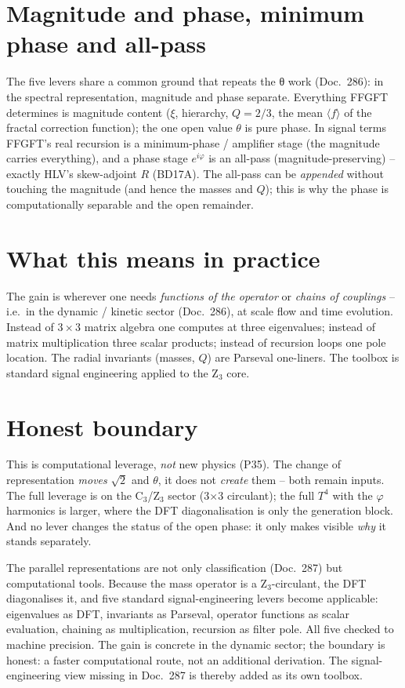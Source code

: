 \section{Magnitude and phase, minimum phase and all-pass}
The five levers share a common ground that repeats the θ work (Doc.~286): in the spectral
representation, magnitude and phase separate. Everything FFGFT determines is magnitude content ($\xi$,
hierarchy, $Q=2/3$, the mean $\langle f\rangle$ of the fractal correction function); the one open value $\theta$ is pure phase. In signal terms
FFGFT's real recursion is a minimum-phase / amplifier stage (the magnitude carries everything), and a
phase stage $e^{i\varphi}$ is an all-pass (magnitude-preserving) -- exactly HLV's skew-adjoint $R$
(BD17A). The all-pass can be \emph{appended} without touching the magnitude (and hence the masses and
$Q$); this is why the phase is computationally separable and the open remainder.

\section{What this means in practice}
The gain is wherever one needs \emph{functions of the operator} or \emph{chains of couplings} -- i.e.\
in the dynamic / kinetic sector (Doc.~286), at scale flow and time evolution. Instead of $3\times3$
matrix algebra one computes at three eigenvalues; instead of matrix multiplication three scalar
products; instead of recursion loops one pole location. The radial invariants (masses, $Q$) are
Parseval one-liners. The toolbox is standard signal engineering applied to the Z$_3$ core.

\section{Honest boundary}
\begin{important}
This is computational leverage, \emph{not} new physics (P35). The change of representation \emph{moves}
$\sqrt2$ and $\theta$, it does not \emph{create} them -- both remain inputs. The full leverage is on
the C$_3$/Z$_3$ sector (3$\times$3 circulant); the full $T^4$ with the $\varphi$ harmonics is larger,
where the DFT diagonalisation is only the generation block. And no lever changes the status of the open
phase: it only makes visible \emph{why} it stands separately.
\end{important}

\begin{conclusionBox}
The parallel representations are not only classification (Doc.~287) but computational tools. Because
the mass operator is a Z$_3$-circulant, the DFT diagonalises it, and five standard signal-engineering
levers become applicable: eigenvalues as DFT, invariants as Parseval, operator functions as scalar
evaluation, chaining as multiplication, recursion as filter pole. All five checked to machine precision.
The gain is concrete in the dynamic sector; the boundary is honest: a faster computational route, not an
additional derivation. The signal-engineering view missing in Doc.~287 is thereby added as its own
toolbox.
\end{conclusionBox}
